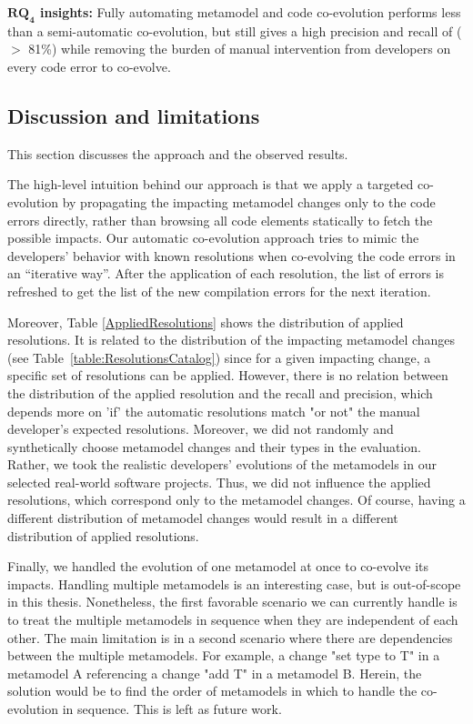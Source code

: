 \begin{tcolorbox}[boxsep=-2pt]
\textbf{$\boldsymbol{RQ_4}$ insights:}
Fully automating metamodel and code co-evolution performs less than a semi-automatic co-evolution, but still gives a high precision and recall of ($>$ 81\%) while removing the burden of manual intervention from developers on every code error to co-evolve. 
\end{tcolorbox}


\subsection{Discussion and limitations}
This section discusses the approach and the observed results. 

The high-level intuition behind our approach is that we apply a targeted co-evolution by propagating the impacting metamodel changes only to the code errors directly, rather than browsing all code elements statically to fetch the possible impacts.
Our automatic co-evolution approach tries to mimic the developers' behavior with known resolutions when co-evolving the code errors in an “iterative way”. After the application of each resolution, the list of errors %
is refreshed to get the list of the new compilation errors for the next iteration.

Moreover, Table \ref{AppliedResolutions} shows the distribution of applied resolutions. It is related to the distribution of the impacting metamodel changes (see Table~\ref{table:ResolutionsCatalog}) since for a given impacting change, a specific set of resolutions can be applied. 
However, there is no relation between the distribution of the applied resolution and the recall and precision, which depends more on 'if' the automatic resolutions match "or not" the manual developer’s expected resolutions. Moreover, we did not randomly and synthetically choose metamodel changes and their types in the evaluation. Rather, we took the realistic developers' evolutions of the metamodels in our selected real-world software projects. Thus, we did not influence the applied resolutions, which correspond only to the metamodel changes. Of course, having a different distribution of metamodel changes would result in a different distribution of applied resolutions. 

Finally, we handled the evolution of one metamodel at once to co-evolve its impacts. Handling multiple metamodels is an interesting case, but is out-of-scope in this thesis. Nonetheless, the first favorable scenario we can currently handle is to treat the multiple metamodels in sequence when they are independent of each other. The main limitation is in a second scenario where there are dependencies between the multiple metamodels. For example, a change "set type to T" in a metamodel A referencing a change "add T" in a metamodel B. Herein, the solution would be to find the order of metamodels in which to handle the co-evolution in sequence. This is left as future work. 

